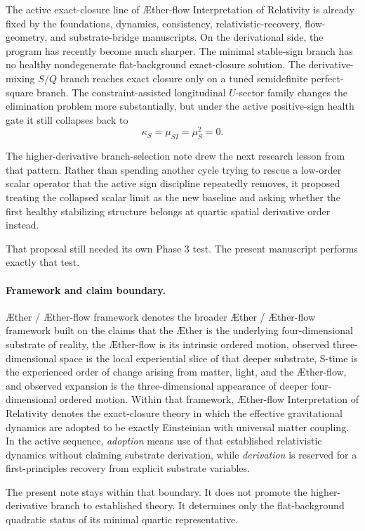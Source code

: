 \documentclass[11pt]{article}
\newcommand{\Aether}{\AE{}ther}
\newcommand{\Aflow}{\AE{}ther-flow}
\newcommand{\TheoryName}{\Aflow{} Interpretation of Relativity}
\newcommand{\TheoryProgram}{\Aether{} / \Aflow{} framework}
\begin{document}
The active exact-closure line of \TheoryName{} is already fixed by the foundations, dynamics, consistency, relativistic-recovery, flow-geometry, and substrate-bridge manuscripts. On the derivational side, the program has recently become much sharper. The minimal stable-sign branch has no healthy nondegenerate flat-background exact-closure solution. The derivative-mixing \(S/Q\) branch reaches exact closure only on a tuned semidefinite perfect-square branch. The constraint-assisted longitudinal \(U\)-sector family changes the elimination problem more substantially, but under the active positive-sign health gate it still collapses back to
\[
\kappa_S=\mu_{SI}=\mu_S^2=0.
\]

The higher-derivative branch-selection note drew the next research lesson from that pattern. Rather than spending another cycle trying to rescue a low-order scalar operator that the active sign discipline repeatedly removes, it proposed treating the collapsed scalar limit as the new baseline and asking whether the first healthy stabilizing structure belongs at quartic spatial derivative order instead.

That proposal still needed its own Phase 3 test. The present manuscript performs exactly that test.

\paragraph{Framework and claim boundary.}
\TheoryProgram{} denotes the broader \Aether{} / \Aflow{} framework built on the claims that the \Aether{} is the underlying four-dimensional substrate of reality, the \Aflow{} is its intrinsic ordered motion, observed three-dimensional space is the local experiential slice of that deeper substrate, S-time is the experienced order of change arising from matter, light, and the \Aflow{}, and observed expansion is the three-dimensional appearance of deeper four-dimensional ordered motion. Within that framework, \TheoryName{} denotes the exact-closure theory in which the effective gravitational dynamics are adopted to be exactly Einsteinian with universal matter coupling. In the active sequence, \emph{adoption} means use of that established relativistic dynamics without claiming substrate derivation, while \emph{derivation} is reserved for a first-principles recovery from explicit substrate variables.

The present note stays within that boundary. It does not promote the higher-derivative branch to established theory. It determines only the flat-background quadratic status of its minimal quartic representative.
\end{document}
